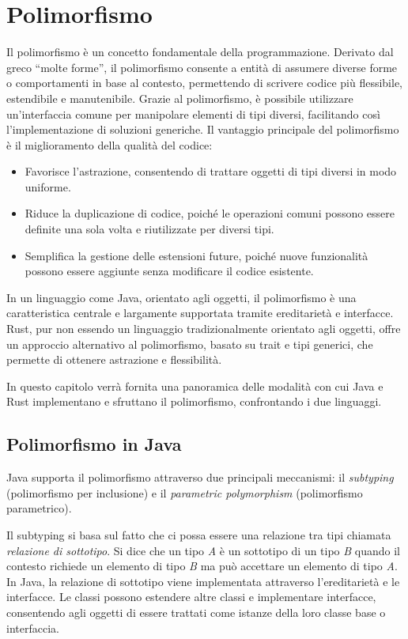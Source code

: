 
\chapter{Polimorfismo}
Il polimorfismo è un concetto fondamentale della programmazione. Derivato dal greco “molte forme”, il polimorfismo consente a entità di assumere diverse forme o comportamenti in base al contesto, permettendo di scrivere codice più flessibile, estendibile e manutenibile. Grazie al polimorfismo, è possibile utilizzare un'interfaccia comune per manipolare elementi di tipi diversi, facilitando così l'implementazione di soluzioni generiche. Il vantaggio principale del polimorfismo è il miglioramento della qualità del codice:
\begin{itemize}
    \item Favorisce l'astrazione, consentendo di trattare oggetti di tipi diversi in modo uniforme.
    \item Riduce la duplicazione di codice, poiché le operazioni comuni possono essere definite una sola volta e riutilizzate per diversi tipi.
    \item Semplifica la gestione delle estensioni future, poiché nuove funzionalità possono essere aggiunte senza modificare il codice esistente.
\end{itemize}
In un linguaggio come Java, orientato agli oggetti, il polimorfismo è una caratteristica centrale e largamente supportata tramite ereditarietà e interfacce. Rust, pur non essendo un linguaggio tradizionalmente orientato agli oggetti, offre un approccio alternativo al polimorfismo, basato su trait e tipi generici, che permette di ottenere astrazione e flessibilità.

In questo capitolo verrà fornita una panoramica delle modalità con cui Java e Rust implementano e sfruttano il polimorfismo, confrontando i due linguaggi.

\section{Polimorfismo in Java}
Java supporta il polimorfismo attraverso due principali meccanismi: il \textit{subtyping} (polimorfismo per inclusione) e il \textit{parametric polymorphism} (polimorfismo parametrico). 

Il subtyping si basa sul fatto che ci possa essere una relazione tra tipi chiamata \textit{relazione di sottotipo}. Si dice che un tipo \textit{A} è un sottotipo di un tipo \textit{B} quando il contesto richiede un elemento di tipo \textit{B} ma può accettare un elemento di tipo \textit{A}. In Java, la relazione di sottotipo viene implementata attraverso l'ereditarietà e le interfacce. Le classi possono estendere altre classi e implementare interfacce, consentendo agli oggetti di essere trattati come istanze della loro classe base o interfaccia. 

